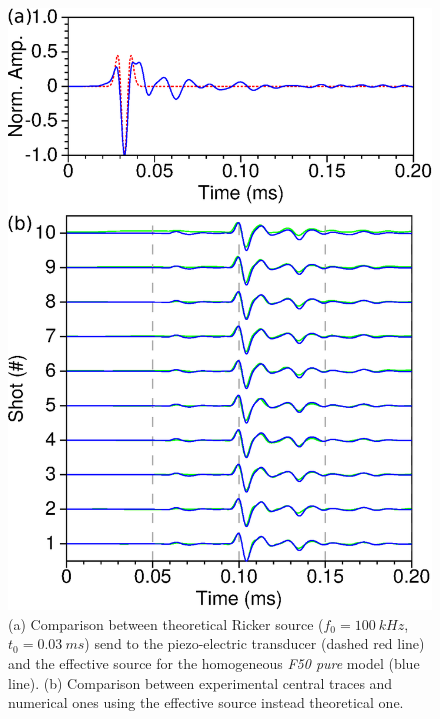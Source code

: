\documentclass[manuscript,revised]{geophysics}
\begin{document}

\begin{figure}[!h]
	\centering
	\includegraphics[scale=0.5]{fig/spec_F50_CT_COMP.eps}
	\caption{(a) Comparison between theoretical Ricker source ($f_{0}=100\ kHz$, $t_{0}=0.03\ ms$) send to the piezo-electric transducer (dashed red line) and the effective source for the homogeneous \textit{F50 pure} model (blue line). (b) Comparison between experimental central traces and numerical ones using the effective source instead theoretical one.}
	\label{panel_srcest_2d_mean_comp}
\end{figure}
\end{document}
